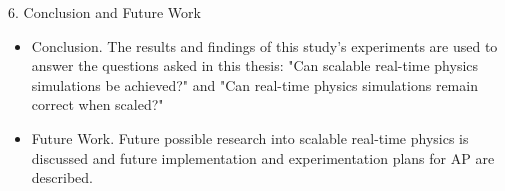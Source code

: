 6. Conclusion and Future Work
\begin{itemize}
	\item Conclusion. The results and findings of this study's experiments are used to answer the questions asked in this thesis: "Can scalable real-time physics simulations be achieved?" and "Can real-time physics simulations remain correct when scaled?"
	\item Future Work. Future possible research into scalable real-time physics is discussed and future implementation and experimentation plans for AP are described.
\end{itemize}
